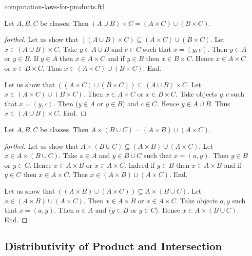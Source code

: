\documentclass{naproche-library}
\begin{document}
\begin{smodule}{computation-laws-for-products.ftl}
  \begin{proposition}[forthel,id=FOUNDATIONS_05_8849658323402752,printid]
    Let $A, B, C$ be classes.
    Then $(A \cup B) \times C = (A \times C) \cup (B \times C)$.
  \end{proposition}
  \begin{proof}[forthel]
    Let us show that $((A \cup B) \times C) \subseteq (A \times C) \cup (B \times C).$ %
      Let $x \in (A \cup B) \times C$.
      Take $y \in A \cup B$ and $c \in C$ such that $x = (y, c)$.
      Then $y \in A$ or $y \in B$.
      If $y \in A$ then $x \in A \times C$ and if $y \in B$ then $x \in B \times C$.
      Hence $x \in A \times C$ or $x \in B \times C$.
      Thus $x \in (A \times C) \cup (B \times C)$.
    End.

    Let us show that $((A \times C) \cup (B \times C)) \subseteq (A \cup B) \times C$. %
      Let $x \in (A \times C) \cup (B \times C)$.
      Then $x \in A \times C$ or $x \in B \times C$.
      Take objects $y, c$ such that $x = (y, c)$.
      Then ($y \in A$ or $y \in B$) and $c \in C$.
      Hence $y \in A \cup B$.
      Thus $x \in (A \cup B) \times C$.
    End.
  \end{proof}

  \begin{proposition}[forthel,id=FOUNDATIONS_05_476526841692160,printid]
    Let $A, B, C$ be classes.
    Then $A \times (B \cup C) = (A \times B) \cup (A \times C)$.
  \end{proposition}
  \begin{proof}[forthel]
    Let us show that $A \times (B \cup C) \subseteq (A \times B) \cup (A \times C)$.
      Let $x \in A \times (B \cup C)$.
      Take $a \in A$ and $y \in B \cup C$ such that $x = (a, y)$.
      Then $y \in B$ or $y \in C$.
      Hence $x \in A \times B$ or $x \in A \times C$.
      Indeed if $y \in B$ then $x \in A \times B$ and if $y \in C$ then $x \in A \times C$.
      Thus $x \in (A \times B) \cup (A \times C)$.
    End.

    Let us show that $((A \times B) \cup (A \times C)) \subseteq A \times (B \cup C)$.
      Let $x \in (A \times B) \cup (A \times C)$.
      Then $x \in A \times B$ or $x \in A \times C$.
      Take objects $a, y$ such that $x = (a, y)$.
      Then $a \in A$ and ($y \in B$ or $y \in C$).
      Hence $x \in A \times (B \cup C)$.
    End.
  \end{proof}


  \subsection*{Distributivity of Product and Intersection}


\end{smodule}
\end{document}
